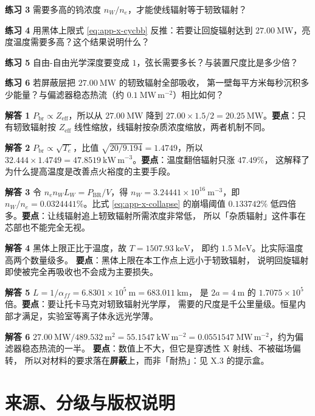 \textbf{练习 3} 需要多高的钨浓度 $n_W/n_e$，才能使线辐射等于轫致辐射？

\textbf{练习 4} 用黑体上限式 \eqref{eq:app-x-cycbb} 反推：若要让回旋辐射达到
$27.00\ \mathrm{MW}$，亮度温度需要多高？这个结果说明什么？

\textbf{练习 5} 自由-自由光学深度要变成 $1$，弦长需要多长？与装置尺度比是多少倍？

\textbf{练习 6} 若屏蔽层把 $27.00\ \mathrm{MW}$ 的轫致辐射全部吸收，
第一壁每平方米每秒沉积多少能量？与偏滤器稳态热流（约 $0.1\ \mathrm{MW\,m^{-2}}$）相比如何？

\textbf{解答 1} $P_{\mathrm{br}}\propto Z_{\mathrm{eff}}$，所以从 $27.00\ \mathrm{MW}$
降到 $27.00\times1.5/2=20.25\ \mathrm{MW}$。\textbf{要点}：只有轫致辐射按 $Z_{\mathrm{eff}}$
线性缩放，线辐射按杂质浓度缩放，两者机制不同。

\textbf{解答 2} $P_{\mathrm{br}}\propto\sqrt{T_e}$，比值
$\sqrt{20/9.194}=1.4749$，所以
$32.444\times1.4749=47.8519\ \mathrm{kW\,m^{-3}}$。\textbf{要点}：温度翻倍辐射只涨 $47.49\%$，
这解释了为什么提高温度是改善点火裕度的主要手段。

\textbf{解答 3} 令 $n_e n_W L_W = P_{\mathrm{BR}}/V$，得
$n_W = 3.24441\times10^{16}\ \mathrm{m^{-3}}$，即
$n_W/n_e = 0.0324441\%$。比式 \eqref{eq:app-x-collapse} 的崩塌阈值
$0.133742\%$ 低四倍多。\textbf{要点}：让线辐射追上轫致辐射所需浓度非常低，
所以「杂质辐射」这件事在芯部也不能完全无视。

\textbf{解答 4} 黑体上限正比于温度，故
$T = 1507.93\ \mathrm{keV}$，
即约 $1.5\ \mathrm{MeV}$。比实际温度高两个数量级多。
\textbf{要点}：黑体上限在本工作点上远小于轫致辐射，
说明回旋辐射即使被完全再吸收也不会成为主要损失。

\textbf{解答 5} $L = 1/\alpha_{ff} = 6.8301\times10^{5}\ \mathrm{m} = 683.011\ \mathrm{km}$，
是 $2a=4\ \mathrm{m}$ 的 $1.7075\times10^{5}$ 倍。\textbf{要点}：要让托卡马克对轫致辐射光学厚，
需要的尺度是千公里量级。恒星内部才满足，实验室等离子体永远光学薄。

\textbf{解答 6} $27.00\ \mathrm{MW}/489.532\ \mathrm{m^2}=55.1547\ \mathrm{kW\,m^{-2}}
=0.0551547\ \mathrm{MW\,m^{-2}}$，约为偏滤器稳态热流的一半。
\textbf{要点}：数值上不大，但它是穿透性 X 射线、不被磁场偏转，
所以对材料的要求落在\textbf{屏蔽}上，而非「耐热」：见 X.3 的提示盒。

\section{来源、分级与版权说明}
\label{sec:app-x-source}

